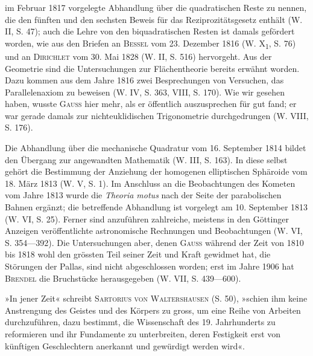 im Februar 1817 vorgelegte Abhandlung über die quadratischen Reste zu
nennen, die den fünften und den sechsten Beweis für das Reziprozitätsgesetz
enthält (W. II, S. 47); auch die Lehre von den biquadratischen Resten ist
damals gefördert worden, wie aus den Briefen an \textsc{Bessel} vom 23. Dezember
1816 (W. X\textsubscript{1}, S. 76) und an \textsc{Dirichlet} vom 30. Mai 1828 (W. II, S. 516)
hervorgeht. Aus der Geometrie sind die Untersuchungen zur Flächentheorie
bereits erwähnt worden. Dazu kommen aus dem Jahre 1816 zwei
\clearpage{}
\noindent Besprechungen von Versuchen, das Parallelenaxiom zu beweisen (W. IV, S. 363,
VIII, S. 170). Wie wir gesehen haben, wusste \textsc{Gauss} hier mehr, als er öffentlich
auszusprechen für gut fand; er war gerade damals zur nichteuklidischen
Trigonometrie durchgedrungen (W. VIII, S. 176).
\par
Die Abhandlung über die mechanische Quadratur vom 16. September
1814 bildet den Übergang zur angewandten Mathematik (W. III, S. 163). In
diese selbst gehört die Bestimmung der Anziehung der homogenen elliptischen
Sphäroide vom 18. März 1813 (W. V, S. 1). Im Anschluss an die Beobachtungen
des Kometen vom Jahre 1813 wurde die \textit{Theoria motus} nach der
Seite der parabolischen Bahnen ergänzt; die betreffende Abhandlung ist vorgelegt
am 10. September 1813 (W. VI, S. 25). Ferner sind anzuführen zahlreiche,
meistens in den Göttinger Anzeigen veröffentlichte astronomische Rechnungen
und Beobachtungen (W. VI, S. 354—392). Die Untersuchungen aber,
denen \textsc{Gauss} während der Zeit von 1810 bis 1818 wohl den grössten Teil
seiner Zeit und Kraft gewidmet hat, die Störungen der Pallas, sind nicht abgeschlossen
worden; erst im Jahre 1906 hat \textsc{Brendel} die Bruchstücke herausgegeben
(W. VII, S. 439—600).
\par
»In jener Zeit« schreibt \textsc{Sartorius von Waltershausen} (S. 50), »schien
ihm keine Anstrengung des Geistes und des Körpers zu gross, um eine Reihe
von Arbeiten durchzuführen, dazu bestimmt, die Wissenschaft des 19. Jahrhunderts
zu reformieren und ihr Fundamente zu unterbreiten, deren Festigkeit
erst von künftigen Geschlechtern anerkannt und gewürdigt werden wird«.
\clearpage\endgroup
